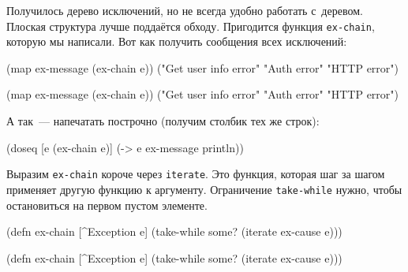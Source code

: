 \fi


Получилось дерево исключений, но не всегда удобно работать с~деревом. Плоская
структура лучше поддаётся обходу. Пригодится функция \verb|ex-chain|, которую
мы написали. Вот как получить сообщения всех исключений:

\ifx\devicetype\mobile

\begin{english}
  \begin{clojure}
(map ex-message (ex-chain e))
("Get user info error"
 "Auth error" "HTTP error")
  \end{clojure}
\end{english}

\else

\begin{english}
  \begin{clojure}
(map ex-message (ex-chain e))
("Get user info error" "Auth error" "HTTP error")
  \end{clojure}
\end{english}

\fi

\noindent
А так~--- напечатать построчно (получим столбик тех же строк):


\begin{english}
  \begin{clojure}
(doseq [e (ex-chain e)]
  (-> e ex-message println))
  \end{clojure}
\end{english}

Выразим \verb|ex-chain| короче через \verb|iterate|. Это функция, которая
шаг за шагом применяет другую функцию к аргументу. Ограничение
\verb|take-while| нужно, чтобы остановиться на первом пустом элементе.

\ifx\devicetype\mobile

\begin{english}
  \begin{clojure}
(defn ex-chain [^Exception e]
  (take-while some?
    (iterate ex-cause e)))
  \end{clojure}
\end{english}

\else

\begin{english}
  \begin{clojure}
(defn ex-chain [^Exception e]
  (take-while some? (iterate ex-cause e)))
  \end{clojure}
\end{english}

